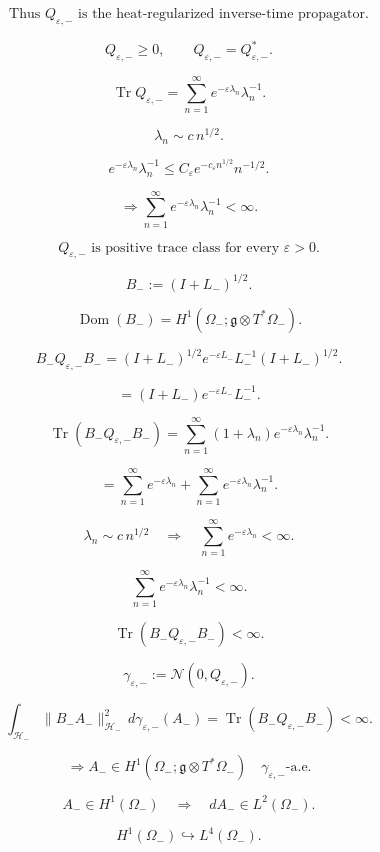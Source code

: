 \documentclass[11pt]{article}
\begin{document}
\[
\text{Thus }Q_{\varepsilon,-}\text{ is the heat-regularized inverse-time propagator.}
\]

\[
Q_{\varepsilon,-}\ge0,
\qquad
Q_{\varepsilon,-}=Q_{\varepsilon,-}^\ast.
\]

\[
\operatorname{Tr}Q_{\varepsilon,-}
=
\sum_{n=1}^{\infty}
e^{-\varepsilon\lambda_n}\lambda_n^{-1}.
\]

\[
\lambda_n\sim c\,n^{1/2}.
\]

\[
e^{-\varepsilon\lambda_n}\lambda_n^{-1}
\le
C_\varepsilon e^{-c_\varepsilon n^{1/2}}n^{-1/2}.
\]

\[
\Longrightarrow
\sum_{n=1}^{\infty}
e^{-\varepsilon\lambda_n}\lambda_n^{-1}
<\infty.
\]

\[
\boxed{
Q_{\varepsilon,-}
\text{ is positive trace class for every }\varepsilon>0.
}
\]

\[
B_-:=(I+L_-)^{1/2}.
\]

\[
\operatorname{Dom}(B_-)
=
H^1(\Omega_-;\mathfrak g\otimes T^\ast\Omega_-).
\]

\[
B_-Q_{\varepsilon,-}B_-
=
(I+L_-)^{1/2}
e^{-\varepsilon L_-}L_-^{-1}
(I+L_-)^{1/2}.
\]

\[
=
(I+L_-)
e^{-\varepsilon L_-}L_-^{-1}.
\]

\[
\operatorname{Tr}(B_-Q_{\varepsilon,-}B_-)
=
\sum_{n=1}^{\infty}
(1+\lambda_n)e^{-\varepsilon\lambda_n}\lambda_n^{-1}.
\]

\[
=
\sum_{n=1}^{\infty}
e^{-\varepsilon\lambda_n}
+
\sum_{n=1}^{\infty}
e^{-\varepsilon\lambda_n}\lambda_n^{-1}.
\]

\[
\lambda_n\sim c\,n^{1/2}
\quad\Longrightarrow\quad
\sum_{n=1}^{\infty}
e^{-\varepsilon\lambda_n}
<\infty.
\]

\[
\sum_{n=1}^{\infty}
e^{-\varepsilon\lambda_n}\lambda_n^{-1}
<\infty.
\]

\[
\boxed{
\operatorname{Tr}(B_-Q_{\varepsilon,-}B_-)<\infty.
}
\]

\[
\gamma_{\varepsilon,-}
:=
\mathcal N(0,Q_{\varepsilon,-}).
\]

\[
\int_{\mathcal H_-}
\|B_-A_-\|_{\mathcal H_-}^2
\,d\gamma_{\varepsilon,-}(A_-)
=
\operatorname{Tr}(B_-Q_{\varepsilon,-}B_-)
<\infty.
\]

\[
\Longrightarrow
A_-\in H^1(\Omega_-;\mathfrak g\otimes T^\ast\Omega_-)
\quad
\gamma_{\varepsilon,-}\text{-a.e.}
\]

\[
A_-\in H^1(\Omega_-)
\quad\Longrightarrow\quad
dA_-\in L^2(\Omega_-).
\]

\[
H^1(\Omega_-)\hookrightarrow L^4(\Omega_-).
\]
\end{document}
